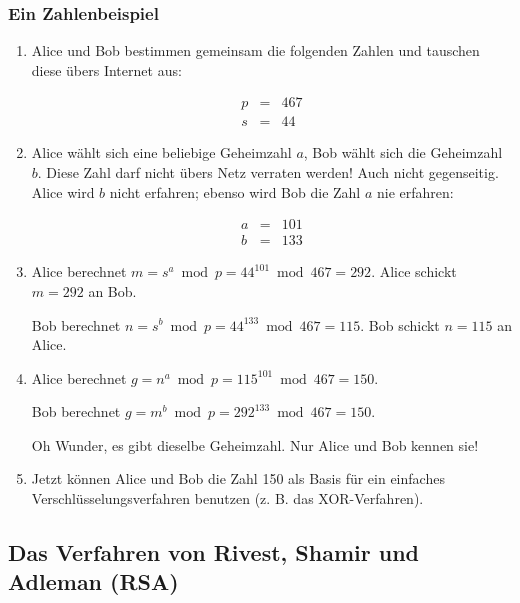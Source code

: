 \subsubsection*{Ein Zahlenbeispiel}

\begin{enumerate}

\item Alice und Bob bestimmen gemeinsam die folgenden Zahlen und
tauschen diese übers Internet aus:

  \begin{eqnarray*}
	 p &=& 467 \\
         s &=& 44
  \end{eqnarray*}

\item Alice wählt sich eine beliebige Geheimzahl \(a\), Bob wählt sich die Geheimzahl \(b\).
      Diese Zahl darf nicht übers Netz verraten werden! Auch nicht gegenseitig. Alice wird \(b\)
      nicht erfahren; ebenso wird Bob die Zahl \(a\) nie erfahren:

  \begin{eqnarray*}
	 a &=& 101 \\
         b &=& 133
  \end{eqnarray*}

\item Alice berechnet  \(m = s^a \bmod p  =  44^{101} \bmod 467 = 292\).
      Alice schickt \(m = 292\) an Bob.

      Bob berechnet  \(n = s^b \bmod p  =  44^{133} \bmod 467 = 115\).
      Bob schickt \(n = 115\) an Alice.

\item Alice berechnet \(g = n^a \bmod p = 115^{101} \bmod 467 = 150\).

      Bob berechnet   \(g = m^b \bmod p = 292^{133} \bmod 467 = 150\).

      Oh Wunder, es gibt dieselbe Geheimzahl. Nur Alice und Bob kennen sie!

\item Jetzt können Alice und Bob die Zahl 150 als Basis für ein einfaches
      Verschlüsselungsverfahren benutzen (z. B. das XOR-Verfahren).
\end{enumerate}



\subsection{Das Verfahren von Rivest, Shamir und Adleman (RSA)}
\label{subsec:rsa}

